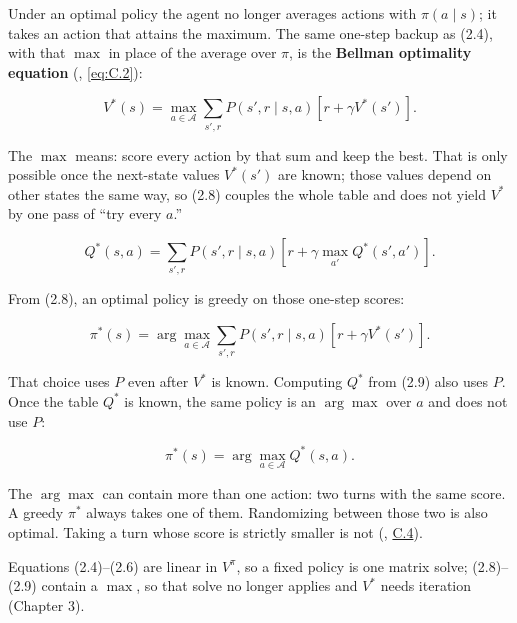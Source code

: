 Under an optimal policy the agent no longer averages actions with $\pi(a\mid s)$; it takes an action that attains the maximum. The same one-step backup as (2.4), with that $\max$ in place of the average over $\pi$, is the \textbf{Bellman optimality equation} (, \eqref{eq:C.2}):

\begin{equation}
V^*(s) = \max_{a \in \mathcal{A}} \sum_{s',r} P(s',r \mid s,a) \left[ r + \gamma V^*(s') \right].
\tag{2.8}
\end{equation}

The $\max$ means: score every action by that sum and keep the best. That is only possible once the next-state values $V^*(s')$ are known; those values depend on other states the same way, so (2.8) couples the whole table and does not yield $V^*$ by one pass of ``try every $a$.''

\begin{equation}
Q^*(s,a) = \sum_{s',r} P(s',r \mid s,a) \left[ r + \gamma \max_{a'} Q^*(s',a') \right].
\tag{2.9}
\end{equation}

From (2.8), an optimal policy is greedy on those one-step scores:

\begin{equation}
\pi^*(s)
=
\arg\max_{a \in \mathcal{A}}
\sum_{s',r}
P(s',r \mid s,a)
\left[
r + \gamma V^*(s')
\right].
\tag{2.10}
\end{equation}

That choice uses $P$ even after $V^*$ is known. Computing $Q^*$ from (2.9) also uses $P$. Once the table $Q^*$ is known, the same policy is an $\arg\max$ over $a$ and does not use $P$:

\begin{equation}
\pi^*(s) = \arg\max_{a \in \mathcal{A}} Q^*(s,a).
\tag{2.11}
\end{equation}

The $\arg\max$ can contain more than one action: two turns with the same score. A greedy $\pi^*$ always takes one of them. Randomizing between those two is also optimal. Taking a turn whose score is strictly smaller is not (, \hyperref[app:C.4]{C.4}).

Equations (2.4)--(2.6) are linear in $V^\pi$, so a fixed policy is one matrix solve; (2.8)--(2.9) contain a $\max$, so that solve no longer applies and $V^*$ needs iteration (Chapter 3).
